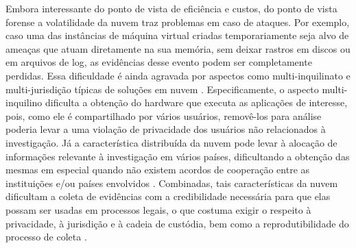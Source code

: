 \documentclass[conference]{IEEEtran}
\begin{document}
%
Embora interessante do ponto de vista de eficiência e custos, do ponto de vista forense a volatilidade da nuvem traz problemas em caso de ataques.
%
Por exemplo, caso uma das instâncias de máquina virtual criadas temporariamente seja alvo de ameaças que atuam diretamente na sua memória, sem deixar rastros em discos ou em arquivos de log, as evidências desse evento podem ser completamente perdidas.
%
Essa dificuldade é ainda agravada por aspectos como multi-inquilinato e multi-jurisdição típicas de soluções em nuvem \cite{Bash2015a}.
%
Especificamente, o aspecto multi-inquilino dificulta a obtenção do hardware que executa as aplicações de interesse, pois, como ele é compartilhado por vários usuários, removê-los para análise poderia levar a uma violação de privacidade dos usuários não relacionados à investigação. 
%
Já a característica distribuída da nuvem pode levar à alocação de informações relevante à investigação em vários países, dificultando a obtenção das mesmas em especial quando não existem acordos de cooperação entre as instituições e/ou países envolvidos \cite{Dykstra2012a}.
%
Combinadas, tais características da nuvem dificultam a coleta de evidências com a credibilidade necessária para que elas possam ser usadas em processos legais,  o que costuma exigir o respeito à privacidade, à jurisdição e à cadeia de custódia, bem como a reprodutibilidade do processo de coleta \cite{Rahman2015}.
\end{document}
